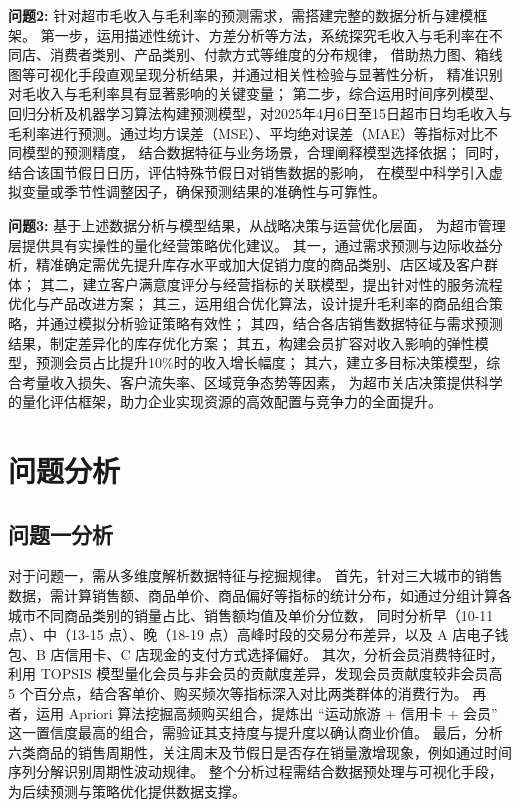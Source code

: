 \documentclass[withoutpreface,bwprint]{cumcmthesis}
\begin{document}
\textbf{问题2:}  
针对超市毛收入与毛利率的预测需求，需搭建完整的数据分析与建模框架。
第一步，运用描述性统计、方差分析等方法，系统探究毛收入与毛利率在不同店、消费者类别、产品类别、付款方式等维度的分布规律，
借助热力图、箱线图等可视化手段直观呈现分析结果，并通过相关性检验与显著性分析，
精准识别对毛收入与毛利率具有显著影响的关键变量；
第二步，综合运用时间序列模型、回归分析及机器学习算法构建预测模型，对2025年4月6日至15日超市日均毛收入与毛利率进行预测。通过均方误差（MSE）、平均绝对误差（MAE）等指标对比不同模型的预测精度，
结合数据特征与业务场景，合理阐释模型选择依据；
同时，结合该国节假日日历，评估特殊节假日对销售数据的影响，
在模型中科学引入虚拟变量或季节性调整因子，确保预测结果的准确性与可靠性。
\par


\textbf{问题3:} 
基于上述数据分析与模型结果，从战略决策与运营优化层面，
为超市管理层提供具有实操性的量化经营策略优化建议。
其一，通过需求预测与边际收益分析，精准确定需优先提升库存水平或加大促销力度的商品类别、店区域及客户群体；
其二，建立客户满意度评分与经营指标的关联模型，提出针对性的服务流程优化与产品改进方案；
其三，运用组合优化算法，设计提升毛利率的商品组合策略，并通过模拟分析验证策略有效性；
其四，结合各店销售数据特征与需求预测结果，制定差异化的库存优化方案；
其五，构建会员扩容对收入影响的弹性模型，预测会员占比提升10\%时的收入增长幅度；
其六，建立多目标决策模型，综合考量收入损失、客户流失率、区域竞争态势等因素，
为超市关店决策提供科学的量化评估框架，助力企业实现资源的高效配置与竞争力的全面提升。

\par






\section{问题分析}
\subsection{问题一分析}
对于问题一，需从多维度解析数据特征与挖掘规律。
首先，针对三大城市的销售数据，需计算销售额、商品单价、商品偏好等指标的统计分布，如通过分组计算各城市不同商品类别的销量占比、销售额均值及单价分位数，
同时分析早（10-11 点）、中（13-15 点）、晚（18-19 点）高峰时段的交易分布差异，以及 A 店电子钱包、B 店信用卡、C 店现金的支付方式选择偏好。
其次，分析会员消费特征时，利用 TOPSIS 模型量化会员与非会员的贡献度差异，发现会员贡献度较非会员高 5 个百分点，结合客单价、购买频次等指标深入对比两类群体的消费行为。
再者，运用 Apriori 算法挖掘高频购买组合，提炼出 “运动旅游 + 信用卡 + 会员” 这一置信度最高的组合，需验证其支持度与提升度以确认商业价值。
最后，分析六类商品的销售周期性，关注周末及节假日是否存在销量激增现象，例如通过时间序列分解识别周期性波动规律。
整个分析过程需结合数据预处理与可视化手段，为后续预测与策略优化提供数据支撑。
\end{document}
